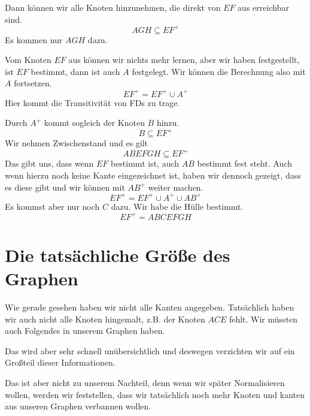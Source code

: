 \documentclass[a4paper, ngerman]{article}
\begin{document}
Dann können wir alle Knoten hinzunehmen,
die direkt von $EF$ aus erreichbar sind.
$$
    AGH \subseteq EF^+  
$$
Es kommen nur $AGH$ dazu.

Vom Knoten $EF$ aus können wir nichts mehr lernen,
aber wir haben festgestellt, ist $EF$ bestimmt,
dann ist auch $A$ festgelegt.
Wir können die Berechnung also mit $A$ fortsetzen.
$$
    EF^+ = EF^+ \cup A^+
$$
Hier kommt die Transitivität von FDs zu trage.

Durch $A^+$ kommt sogleich der Knoten $B$ hinzu.
$$
    B \subseteq EF^+
$$
Wir nehmen Zwischenstand und es gilt
$$
    ABEFGH \subseteq EF^+
$$
Das gibt uns, dass wenn $EF$ bestimmt ist,
auch $AB$ bestimmt fest steht.
Auch wenn hierzu noch keine Kante eingezeichnet ist,
haben wir dennoch gezeigt, dass es diese gibt
und wir können mit $AB^+$ weiter machen.
$$
    EF^+ = EF^+ \cup A^+ \cup AB^+
$$
Es kommst aber nur noch $C$ dazu.
Wir habe die Hülle bestimmt.
$$
    EF^+ = ABCEFGH
$$

\section*{Die tatsächliche Größe des Graphen}
Wie gerade gesehen haben wir nicht alle Kanten angegeben.
Tatsächlich haben wir auch nicht alle Knoten hingemalt,
z.B. der Knoten $ACE$ fehlt.
Wir müssten auch Folgendes in unserem Graphen haben.
\begin{center}
\end{center}
Das wird aber sehr schnell unübersichtlich
und deswegen verzichten wir auf
ein Großteil dieser Informationen.

Das ist aber nicht zu unserem Nachteil,
denn wenn wir später Normalisieren wollen,
werden wir feststellen,
dass wir tatsächlich noch mehr Knoten
und kanten aus unseren Graphen verbannen wollen.
\end{document}
